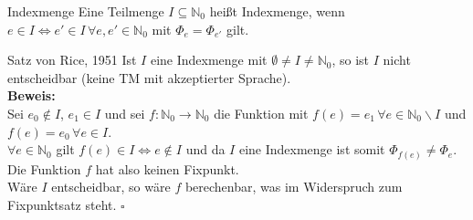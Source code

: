 \begin{defn}{Indexmenge}
    Eine Teilmenge $I \subseteq \mathbb{N}_0$ heißt Indexmenge, wenn $e \in I \Leftrightarrow e' \in I \, \forall e,e' \in \mathbb{N}_0$
    mit $\Phi_e = \Phi_{e'}$ gilt.
\end{defn}

\begin{satz}{Satz von Rice, 1951}
    Ist $I$ eine Indexmenge mit $\emptyset \neq I \neq \mathbb{N}_0$, so ist $I$ nicht entscheidbar (keine TM mit akzeptierter Sprache). \\

    \textbf{Beweis:} \\
    Sei $e_0 \notin I$, $e_1 \in I$ und sei $f: \mathbb{N}_0 \rightarrow \mathbb{N}_0$ die Funktion mit 
    $f(e) = e_1 \, \forall e \in \mathbb{N}_0 \backslash I$ und $f(e) = e_0 \, \forall e \in I$. \\

    $\forall e \in \mathbb{N}_0$ gilt $f(e) \in I \Leftrightarrow e \notin I$ und da $I$ eine Indexmenge ist somit 
    $\Phi_{f(e)} \neq \Phi_e$. Die Funktion $f$ hat also keinen Fixpunkt. \\
    
    Wäre $I$ entscheidbar, so wäre $f$ berechenbar, was im Widerspruch zum Fixpunktsatz steht.
    $\square$
\end{satz}
